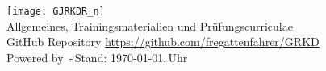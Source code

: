 	\begin{center}
		\texttt{[image: GJRKDR\_n]}\\
		Allgemeines, Trainingsmaterialien und Prüfungscurriculae{\scriptsize \\\textsf{GitHub Repository \href{https://github.com/fregattenfahrer/GRKD}{https://github.com/fregattenfahrer/GRKD}} \\\textsf{Powered by} \LaTeXe \textsf{\,-\,Stand: \today,\,\currenttime Uhr}} 
	\end{center}
	